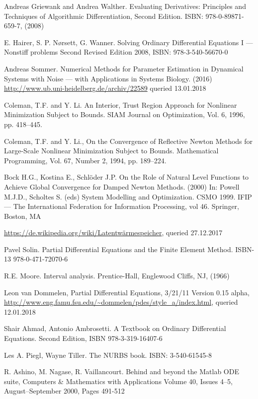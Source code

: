 \documentclass{scrartcl}[12pt, halfparskip]
\numberwithin{equation}{section}
\numberwithin{figure}{section}
\numberwithin{table}{section}
\begin{document}
\begin{thebibliography}{9}
	Andreas Griewank and Andrea Walther.
	Evaluating Derivatives: Principles and Techniques of Algorithmic Differentiation, Second Edition.
	ISBN: 978-0-89871-659-7, 
	(2008)

	E. Hairer, S. P. Nørsett, G. Wanner.
	Solving Ordinary Differential Equations I --- Nonstiff problems
	Second Revised Edition
	2008, ISBN: 978-3-540-56670-0
	
	Andreas Sommer.
	Numerical Methods for Parameter Estimation in Dynamical Systems with Noise --- with Applications in Systems Biology. (2016)
	\url{http://www.ub.uni-heidelberg.de/archiv/22589} queried 13.01.2018
	
	Coleman, T.F. and Y. Li.
	An Interior, Trust Region Approach for Nonlinear Minimization Subject to Bounds.
	SIAM Journal on Optimization, Vol. 6, 1996, pp. 418–445.
  
	Coleman, T.F. and Y. Li., 
	On the Convergence of Reflective Newton Methods for Large-Scale Nonlinear Minimization Subject to Bounds.
	Mathematical Programming, Vol. 67, Number 2, 1994, pp. 189–224.
	
	Bock H.G., Kostina E., Schlöder J.P. 
	On the Role of Natural Level Functions to Achieve Global Convergence for Damped Newton Methods. (2000)
	In: Powell M.J.D., Scholtes S. (eds) System Modelling and Optimization. CSMO 1999. IFIP — The International Federation for Information Processing, vol 46. Springer, Boston, MA
	
	\url{https://de.wikipedia.org/wiki/Latentwärmespeicher}, queried 27.12.2017
	
	Pavel Solin.
	Partial Differential Equations and the Finite Element Method.
	ISBN-13 978-0-471-72070-6
	
	R.E. Moore. 
	Interval analysis. 
	Prentice-Hall, Englewood Cliffs, NJ, 
	(1966)
  
	Leon van Dommelen, 
	Partial Differential Equations, 3/21/11 Version 0.15 alpha,
	\url{http://www.eng.famu.fsu.edu/~dommelen/pdes/style_a/index.html}, queried 12.01.2018
	
	Shair Ahmad, Antonio Ambrosetti.
	A Textbook on Ordinary Differential Equations. Second Edition, 
	ISBN 978-3-319-16407-6
	
	Les A. Piegl, Wayne Tiller.
	The NURBS book.
	ISBN: 3-540-61545-8 
	
	R. Ashino, M. Nagase, R. Vaillancourt.
	Behind and beyond the Matlab ODE suite,
	Computers \& Mathematics with Applications Volume 40, Issues 4–5, August–September 2000, Pages 491-512
  
\end{thebibliography}
\end{document}
